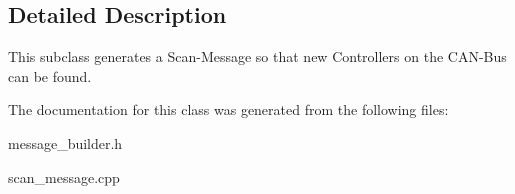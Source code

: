 \subsection{Detailed Description}
This subclass generates a Scan-\/\+Message so that new Controllers on the C\+A\+N-\/\+Bus can be found. 

The documentation for this class was generated from the following files\+:\begin{DoxyCompactItemize}
\item 
message\+\_\+builder.\+h\item 
scan\+\_\+message.\+cpp\end{DoxyCompactItemize}
